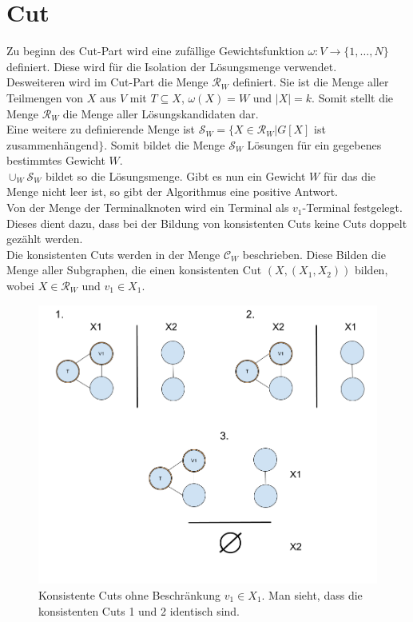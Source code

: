 \section{Cut}
\label{sec:st_cut}
Zu beginn des Cut-Part wird eine zufällige Gewichtsfunktion $\omega:V\rightarrow \{1,\dots,N\}$ definiert. Diese wird für die Isolation der Lösungsmenge verwendet.\\
Desweiteren wird im Cut-Part die Menge $\mathcal{R}_W$ definiert. Sie ist die Menge aller Teilmengen von $X$ aus $V$ mit $T \subseteq X$, $\omega(X)=W$ und $|X|=k$. Somit stellt die Menge $\mathcal{R}_W$ die Menge aller Lösungskandidaten dar.\\
Eine weitere zu definierende Menge ist $\mathcal{S}_W=\{X \in \mathcal{R}_W | G[X]$ ist zusammenhängend$\}$. Somit bildet die Menge $\mathcal{S}_W$ Lösungen für ein gegebenes bestimmtes Gewicht $W$.\\
$\cup_W \mathcal{S}_W$ bildet so die Lösungsmenge. Gibt es nun ein Gewicht $W$ für das die Menge nicht leer ist, so gibt der Algorithmus eine positive Antwort.\\
Von der Menge der Terminalknoten wird ein Terminal als $v_1$-Terminal festgelegt. Dieses dient dazu, dass bei der Bildung von konsistenten Cuts keine Cuts doppelt gezählt werden.\\
Die konsistenten Cuts werden in der Menge  $\mathcal{C}_W$ beschrieben. Diese Bilden die Menge aller Subgraphen, die einen konsistenten Cut $(X,(X_1,X_2))$ bilden, wobei $X\in \mathcal{R}_W$ und $v_1 \in X_1$.
\begin{figure}
\label{fig:st_cut}
  \centering
    \includegraphics[width=1.0\textwidth]{./imgs/terminal_v1.png}
  	\caption{Konsistente Cuts ohne Beschränkung $v_1 \in X_1$. Man sieht, dass die konsistenten Cuts 1 und 2 identisch sind.}
\end{figure}

